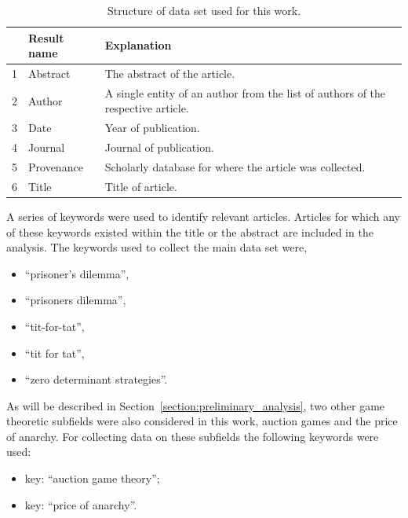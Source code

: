 \documentclass{article}
\theoremstyle{definition}
\begin{document}
\begin{table}[!hbtp]
    \begin{center}
        \begin{tabular}{lll}
            \toprule
             & Result name & Explanation \\
             \midrule
             1 & Abstract & The abstract of the article.\\ 
             2 & Author & A single entity of an author from the list of
             authors of the respective article.\\ 
             3 & Date & Year of publication.\\ 
             4 & Journal & Journal of publication.\\ 
             5 & Provenance & Scholarly database for where the article was
             collected.\\ 
             6 & Title & Title of article.\\ 
            \bottomrule
        \end{tabular}
    \end{center}
    \caption{Structure of data set used for this work.}
    \label{table:result_set}
\end{table}

A series of keywords were used to identify relevant articles. Articles for which
any of these keywords existed within the title or the abstract are included in the
analysis. The keywords used to collect the main data set were,

\begin{itemize}
    \item ``prisoner's dilemma'',
    \item ``prisoners dilemma'',
    \item ``tit-for-tat'',
    \item ``tit for tat'',
    \item ``zero determinant strategies''.
\end{itemize}

As will be described in Section~\ref{section:preliminary_analysis}, two other
game theoretic subfields were also considered in this work, auction games and the
price of anarchy. For collecting data on these subfields the following keywords were used:

\begin{itemize}
    \item key: ``auction game theory'';
    \item key: ``price of anarchy''.
\end{itemize}
\end{document}
